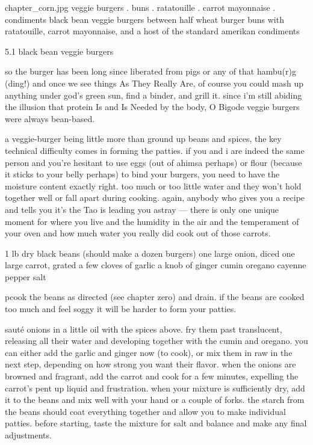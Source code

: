 \mychapter
{chapter_corn.jpg}
{veggie burgers . buns . ratatouille . carrot mayonnaise . condiments}
{black bean veggie burgers between half wheat burger buns with
ratatouille, carrot mayonnaise, and a host of the standard amerikan
condiments}

5.1  black bean veggie burgers

so the burger has been long since liberated from pigs or any of that hambu(r)g (ding!) and once we see things As They Really Are, of course you could mash up anything under god's green sun, find a binder, and grill it. since i'm still abiding the illusion that protein Is and Is Needed by the body, O Bigode veggie burgers were always bean-based.

a veggie-burger being little more than ground up beans and spices, the key technical difficulty comes in forming the patties. if you and i are indeed the same person and you're hesitant to use eggs (out of ahimsa perhaps) or flour (because it sticks to your belly perhaps) to bind your burgers, you need to have the moisture content exactly right. too much or too little water and they won't hold together well or fall apart during cooking. again, anybody who gives you a recipe and tells you it's the Tao is leading you astray --- there is only one unique moment for where you live and the humidity in the air and the temperament of your oven and how much water you really did cook out of those carrots.

1 lb dry black beans (should make a dozen burgers)
one large onion, diced
one large carrot, grated
a few cloves of garlic
a knob of ginger
cumin
oregano
cayenne pepper
salt

pcook the beans as directed (see chapter zero) and drain. if the beans are cooked too much and feel soggy it will be harder to form your patties. 

saut\'{e} onions in a little oil with the spices above. fry them past translucent, releasing all their water and developing together with the cumin and oregano. you can either add the garlic and ginger now (to cook), or mix them in raw in the next step, depending on how strong you want their flavor.
	when the onions are browned and fragrant, add the carrot and cook for a few minutes, expelling the carrot's pent up liquid and frustration. when your mixture is sufficiently dry, add it to the beans and mix well with your hand or a couple of forks. the starch from the beans should coat everything together and allow you to make individual patties. before starting, taste the mixture for salt and balance and make any final adjustments.

